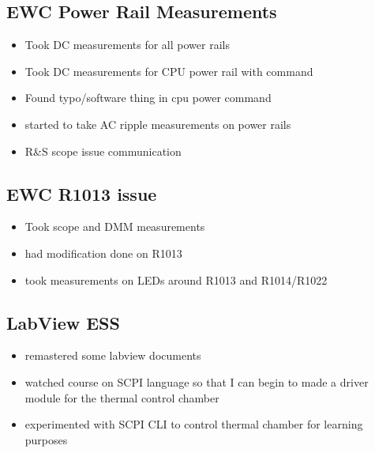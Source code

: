\documentclass{article}
\begin{document}
\subsection*{EWC Power Rail Measurements}
\begin{itemize}
    \item Took DC measurements for all power rails
    \item Took DC measurements for CPU power rail with command
    \item Found typo/software thing in cpu power command
    \item started to take AC ripple measurements on power rails
    \item R\&S scope issue communication
\end{itemize}
\subsection*{EWC R1013 issue}
\begin{itemize}
    \item Took scope and DMM measurements
    \item had modification done on R1013
    \item took measurements on LEDs around R1013 and R1014/R1022
\end{itemize}
\subsection*{LabView ESS}
\begin{itemize}
    \item remastered some labview documents
    \item watched course on SCPI language so that I can begin to made a driver module for the thermal control chamber
    \item experimented with SCPI CLI to control thermal chamber for learning purposes
\end{itemize}
\end{document}
